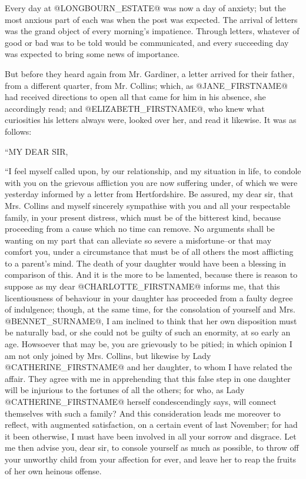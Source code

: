 Every day at @LONGBOURN_ESTATE@ was now a day of anxiety; but the most anxious
part of each was when the post was expected. The arrival of letters
was the grand object of every morning's impatience. Through letters,
whatever of good or bad was to be told would be communicated, and every
succeeding day was expected to bring some news of importance.

But before they heard again from Mr. Gardiner, a letter arrived for
their father, from a different quarter, from Mr. Collins; which, as @JANE_FIRSTNAME@
had received directions to open all that came for him in his absence,
she accordingly read; and @ELIZABETH_FIRSTNAME@, who knew what curiosities his
letters always were, looked over her, and read it likewise. It was as
follows:

``MY DEAR SIR,

``I feel myself called upon, by our relationship, and my situation
in life, to condole with you on the grievous affliction you are now
suffering under, of which we were yesterday informed by a letter from
Hertfordshire. Be assured, my dear sir, that Mrs. Collins and myself
sincerely sympathise with you and all your respectable family, in
your present distress, which must be of the bitterest kind, because
proceeding from a cause which no time can remove. No arguments shall be
wanting on my part that can alleviate so severe a misfortune--or that
may comfort you, under a circumstance that must be of all others the
most afflicting to a parent's mind. The death of your daughter would
have been a blessing in comparison of this. And it is the more to
be lamented, because there is reason to suppose as my dear @CHARLOTTE_FIRSTNAME@
informs me, that this licentiousness of behaviour in your daughter has
proceeded from a faulty degree of indulgence; though, at the same time,
for the consolation of yourself and Mrs. @BENNET_SURNAME@, I am inclined to think
that her own disposition must be naturally bad, or she could not be
guilty of such an enormity, at so early an age. Howsoever that may be,
you are grievously to be pitied; in which opinion I am not only joined
by Mrs. Collins, but likewise by Lady @CATHERINE_FIRSTNAME@ and her daughter, to
whom I have related the affair. They agree with me in apprehending that
this false step in one daughter will be injurious to the fortunes of
all the others; for who, as Lady @CATHERINE_FIRSTNAME@ herself condescendingly says,
will connect themselves with such a family? And this consideration leads
me moreover to reflect, with augmented satisfaction, on a certain event
of last November; for had it been otherwise, I must have been involved
in all your sorrow and disgrace. Let me then advise you, dear sir, to
console yourself as much as possible, to throw off your unworthy child
from your affection for ever, and leave her to reap the fruits of her
own heinous offense.


